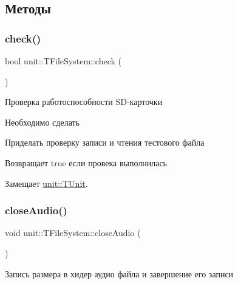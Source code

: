 \subsection{Методы}
\mbox{\label{classunit_1_1_t_file_system_a0737b50d219570ae2e11ea17a32cc85c}} 
\subsubsection{\texorpdfstring{check()}{check()}}
{\footnotesize\ttfamily bool unit\+::\+T\+File\+System\+::check (\begin{DoxyParamCaption}{ }\end{DoxyParamCaption})\hspace{0.3cm}{\ttfamily [virtual]}}



Проверка работоспособности S\+D-\/карточки 

\begin{DoxyRefDesc}{Необходимо сделать}
\item[\hyperlink{todo__todo000008}{Необходимо сделать}]Приделать проверку записи и чтения тестового файла \end{DoxyRefDesc}
\begin{DoxyReturn}{Возвращает}
true если провека выполнилась 
\end{DoxyReturn}


Замещает \hyperlink{classunit_1_1_t_unit_abdcc6daabc86cea10abc96593d9d2c2a}{unit\+::\+T\+Unit}.

\mbox{\label{classunit_1_1_t_file_system_ae30e2668ef7405051b427660fa866302}} 
\subsubsection{\texorpdfstring{close\+Audio()}{closeAudio()}}
{\footnotesize\ttfamily void unit\+::\+T\+File\+System\+::close\+Audio (\begin{DoxyParamCaption}{ }\end{DoxyParamCaption})}



Запись размера в хидер аудио файла и завершение его записи 




